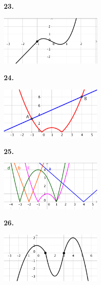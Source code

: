 \documentclass[a4paper, pdf, twoside]{book}
\begin{document}
\begin{multicols}{2}
\begin{enumerate}
\vspace{0.25cm}
\item[\fontfamily{phv}\selectfont\color{blue}\textbf{23. }] 
\mbox {}\par \includegraphics [width=0.4\textwidth ]{img-sol/t5-23}
\vspace{0.25cm}
\item[\fontfamily{phv}\selectfont\color{blue}\textbf{24. }] 
\mbox {}\par \includegraphics [width=0.4\textwidth ]{img-sol/t5-24}
\vspace{0.25cm}
\item[\fontfamily{phv}\selectfont\color{blue}\textbf{25. }] 
\mbox {}\par \includegraphics [width=0.4\textwidth ]{img-sol/t5-25}
\vspace{0.25cm}
\item[\fontfamily{phv}\selectfont\color{blue}\textbf{26. }] 
\mbox {}\par \includegraphics [width=0.4\textwidth ]{img-sol/t5-26}
 \end{enumerate}
\vspace{0.3cm}



\end{multicols}
\end{document}
